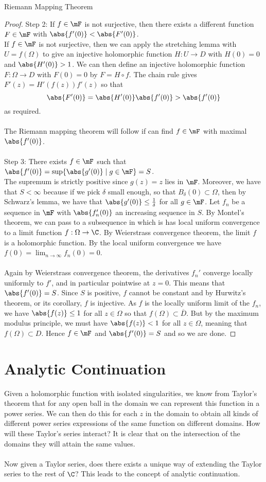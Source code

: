 \documentclass[a4paper]{article}
\begin{document}
\begin{thm}{Riemann Mapping Theorem}{}
\begin{proof}
Step 2: If $f\in\mF$ is not surjective, then there exists a different function $F\in\mF$ with $\abs{f'(0)}<\abs{F'(0)}$. \\
If $f\in\mF$ is not surjective, then we can apply the stretching lemma with $U=f(\Omega)$ to give an injective holomorphic function $H:U\to D$ with $H(0)=0$ and $\abs{H'(0)}>1$. We can then define an injective holomorphic function $F:\Omega\to D$ with $F(0)=0$ by $F=H\circ f$. The chain rule gives $F'(z)=H'(f(z))f'(z)$ so that $$\abs{F'(0)}=\abs{H'(0)}\abs{f'(0)}>\abs{f'(0)}$$ as required. \\~\\

The Riemann mapping theorem will follow if can find $f\in\mF$ with maximal $\abs{f'(0)}$. \\~\\

Step 3: There exists $f\in\mF$ such that $\abs{f'(0)}=\sup\{\abs{g'(0)}\;|\;g\in\mF\}=S$. \\
The supremum is strictly positive since $g(z)=z$ lies in $\mF$. Moreover, we have that $S<\infty$ because if we pick $\delta$ small enough, so that $B_\delta(0)\subset\Omega$, then by Schwarz's lemma, we have that $\abs{g'(0)}\leq\frac{1}{\delta}$ for all $g\in\mF$. Let $f_n$ be a sequence in $\mF$ with $\abs{f_n'(0)}$ an increasing sequence in $S$. By Montel's theorem, we can pass to a subsequence in which is has local uniform convergence to a limit function $f:\Omega\to\C$. By Weierstrass convergence theorem, the limit $f$ is a holomorphic function. By the local uniform convergence we have $f(0)=\lim_{n\to\infty}f_n(0)=0$. \\~\\

Again by Weierstrass convergence theorem, the derivatives $f_n'$ converge locally uniformly to $f'$, and in particular pointwise at $z=0$. This means that $\abs{f'(0)}=S$. Since $S$ is positive, $f$ cannot be constant and by Hurwitz's theorem, or its corollary, $f$ is injective. As $f$ is the locally uniform limit of the $f_n$, we have $\abs{f(z)}\leq 1$ for all $z\in\Omega$ so that $f(\Omega)\subset\overline{D}$. But by the maximum modulus principle, we must have $\abs{f(z)}<1$ for all $z\in\Omega$, meaning that $f(\Omega)\subset D$. Hence $f\in\mF$ and $\abs{f'(0)}=S$ and so we are done. 
\end{proof}
\end{thm}

\pagebreak
\section{Analytic Continuation}
Given a holomorphic function with isolated singularities, we know from Taylor's theorem that for any open ball in the domain we can represent this function in a power series. We can then do this for each $z$ in the domain to obtain all kinds of different power series expressions of the same function on different domains. How will these Taylor's series interact? It is clear that on the intersection of the domains they will attain the same values. \\~\\

Now given a Taylor series, does there exists a unique way of extending the Taylor series to the rest of $\C$? This leads to the concept of analytic continuation. 
\end{document}

